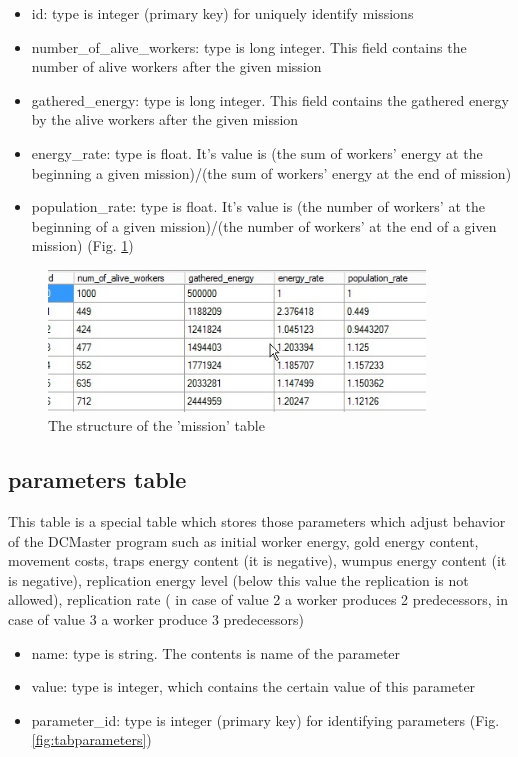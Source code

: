 \documentclass[a4paper,12pt]{article}
\begin{document}
\begin{itemize}
	\item id: type is integer (primary key) for uniquely identify missions
	\item number\_of\_alive\_workers: type is long integer. This field contains the number of alive workers after the given mission
	\item gathered\_energy: type is long integer. This field contains the gathered energy by the alive workers after the given mission 
	\item energy\_rate: type is float. It's value is (the sum of workers' energy at the beginning a given mission)/(the sum of workers' energy at the end of mission)	
	\item population\_rate: type is float.  It's value is (the number of workers' at the beginning of a given mission)/(the number of workers' at the end of a given mission)	(Fig. \ref{fig:tabmission})
	\end{itemize}

\begin{figure}
	\begin{center}
		\includegraphics[width=10cm]{tabmission.jpg}
		\caption{The structure of the 'mission' table}
		\label{fig:tabmission}
	\end{center}
\end{figure}

\subsection{parameters table}
This table is a special table which stores those parameters which adjust behavior of the DCMaster program such as initial worker energy, gold energy content, movement costs, traps energy content (it is negative), wumpus energy content (it is negative), replication energy level (below this value the replication is not allowed), replication rate ( in case of value 2 a worker produces 2 predecessors, in case of value 3 a worker produce 3 predecessors)

\begin{itemize}
	\item name: type is string. The contents is name of the parameter
	\item value: type is integer, which contains the certain value of this parameter
	\item parameter\_id: type is integer (primary key) for identifying parameters
 (Fig. \ref{fig:tabparameters})
\end{itemize}
\end{document}

